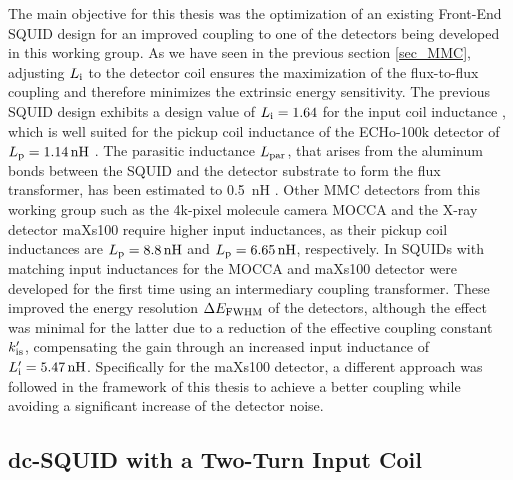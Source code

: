 The main objective for this thesis was the optimization of an existing Front-End SQUID design for an improved coupling to one of the detectors being developed in this working group. As we have seen in the previous section \ref{sec_MMC}, adjusting $L_{\rm i}$ to the detector coil ensures the maximization of the flux-to-flux coupling and therefore minimizes the extrinsic energy sensitivity. The previous SQUID design exhibits a design value of $L_{\rm i}=1.64$ for the input coil inductance \cite{Bauer2022}, which is well suited for the pickup coil inductance of the ECHo-100k detector of $L_{\rm p}=\qty{1.14}{\nano\henry}$ \cite{Mantegazzini2021}. The parasitic inductance $L_{\rm par}$, that arises from the aluminum bonds between the SQUID and the detector substrate to form the flux transformer, has been estimated to \qty{0.5}{\nano\henry} \cite{Hengstler2017}. Other MMC detectors from this working group such as the 4k-pixel molecule camera MOCCA and the X-ray detector maXs100 require higher input inductances, as their pickup coil inductances are $L_{\rm p}=\qty{8.8}{\nano\henry}$ and $L_{\rm p}=\qty{6.65}{\nano\henry}$, respectively. In \cite{Bauer2022} SQUIDs with matching input inductances for the MOCCA and maXs100 detector were developed for the first time using an intermediary coupling transformer. These improved the energy resolution $\Delta E_{\rm FWHM}$ of the detectors, although the effect was minimal for the latter due to a reduction of the effective coupling constant $k_{\rm is}'$, compensating the gain through an increased input inductance of $L_{\rm i}'=\qty{5.47}{\nano\henry}$. Specifically for the maXs100 detector, a different approach was followed in the framework of this thesis to achieve a better coupling while avoiding a significant increase of the detector noise.  

\subsection{dc-SQUID with a Two-Turn Input Coil}

